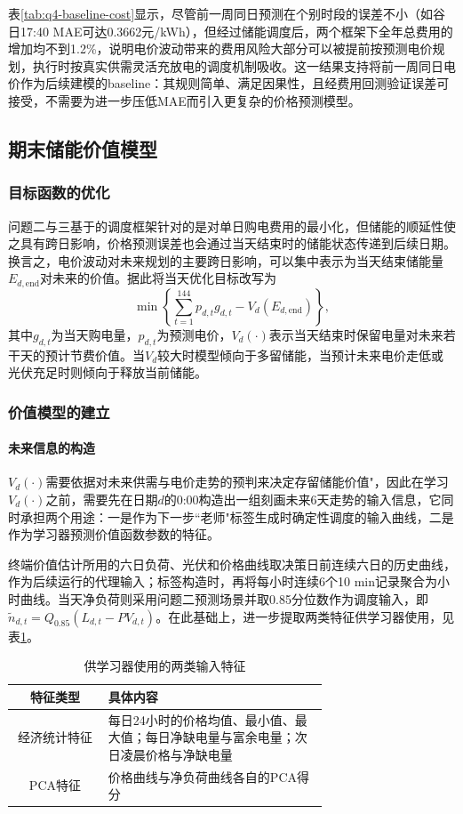 表\ref{tab:q4-baseline-cost}显示，尽管前一周同日预测在个别时段的误差不小（如谷日17:40 MAE可达0.3662元/kWh），但经过储能调度后，两个框架下全年总费用的增加均不到1.2\%，说明电价波动带来的费用风险大部分可以被提前按预测电价规划，执行时按真实供需灵活充放电的调度机制吸收。这一结果支持将前一周同日电价作为后续建模的baseline：其规则简单、满足因果性，且经费用回测验证误差可接受，不需要为进一步压低MAE而引入更复杂的价格预测模型。

\subsection{期末储能价值模型}
\label{sec:q4-terminal-value}
\subsubsection{目标函数的优化}
问题二与三基于的调度框架针对的是对单日购电费用的最小化，但储能的顺延性使之具有跨日影响，价格预测误差也会通过当天结束时的储能状态传递到后续日期。换言之，电价波动对未来规划的主要跨日影响，可以集中表示为当天结束储能量$E_{d,\mathrm{end}}$对未来的价值。据此将当天优化目标改写为
$$
\min\left\{\sum_{t=1}^{144}p_{d,t}g_{d,t}-V_d(E_{d,\mathrm{end}})\right\},
$$
其中$g_{d,t}$为当天购电量，$p_{d,t}$为预测电价，$V_d(\cdot)$表示当天结束时保留电量对未来若干天的预计节费价值。当$V_d$较大时模型倾向于多留储能，当预计未来电价走低或光伏充足时则倾向于释放当前储能。

\subsubsection{价值模型的建立}

\paragraph{未来信息的构造}
$V_d(\cdot)$需要依据对未来供需与电价走势的预判来决定存留储能价值"，因此在学习$V_d(\cdot)$之前，需要先在日期$d$的0:00构造出一组刻画未来6天走势的输入信息，它同时承担两个用途：一是作为下一步``老师"标签生成时确定性调度的输入曲线，二是作为学习器预测价值函数参数的特征。

终端价值估计所用的六日负荷、光伏和价格曲线取决策日前连续六日的历史曲线，作为后续运行的代理输入；标签构造时，再将每小时连续6个10 min记录聚合为小时曲线。当天净负荷则采用问题二预测场景并取0.85分位数作为调度输入，即$\widetilde n_{d,t}=Q_{0.85}(L_{d,t}-PV_{d,t})$。在此基础上，进一步提取两类特征供学习器使用，见表\ref{tab:q4-features}。

\begin{table}[H]
  \centering
  \caption{供学习器使用的两类输入特征}
  \label{tab:q4-features}
  \small
  \renewcommand{\arraystretch}{1.3}
  \begin{tabular}{|c|p{0.7\linewidth}|}
    \hline
    特征类型 & 具体内容 \\
    \hline
    经济统计特征 & 每日24小时的价格均值、最小值、最大值；每日净缺电量与富余电量；次日凌晨价格与净缺电量 \\
    \hline
    PCA特征 & 价格曲线与净负荷曲线各自的PCA得分 \\
    \hline
  \end{tabular}
\end{table}

